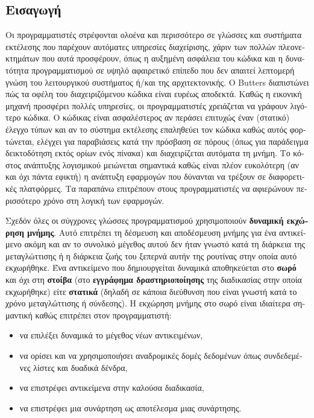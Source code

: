\begin{greek}
\chapter{Εισαγωγή}\label{ch:intro}

Οι προγραμματιστές στρέφονται ολοένα και περισσότερο σε γλώσσες
και συστήματα εκτέλεσης που παρέχουν αυτόματες υπηρεσίες διαχείρισης,
χάριν των πολλών πλεονεκτημάτων
που αυτά προσφέρουν, όπως η αυξημένη ασφάλεια του κώδικα και
η δυνατότητα προγραμματισμού σε υψηλό αφαιρετικό επίπεδο που δεν
απαιτεί λεπτομερή γνώση του λειτουργικού συστήματος ή/και της
αρχιτεκτονικής. Ο Butters \cite{butt07} διαπιστώνει πώς τα οφέλη
του διαχειριζόμενου κώδικα είναι ευρέως αποδεκτά. Καθώς η εικονική
μηχανή προσφέρει πολλές υπηρεσίες, οι προγραμματιστές χρειάζεται
να γράφουν λιγότερο κώδικα. Ο κώδικας είναι ασφαλέστερος αν περάσει
επιτυχώς έναν (στατικό) έλεγχο τύπων και αν το σύστημα εκτέλεσης
επαληθεύει τον κώδικα καθώς αυτός φορτώνεται, ελέγχει για παραβιάσεις
κατά την πρόσβαση σε πόρους (όπως για παράδειγμα δεικτοδότηση εκτός
ορίων ενός πίνακα) και διαχειρίζεται αυτόματα τη μνήμη. Το κόστος
ανάπτυξης λογισμικού μειώνεται σημαντικά καθώς είναι πλέον ευκολότερη
(αν και όχι πάντα εφικτή) η ανάπτυξη εφαρμογών που δύνανται να
τρέξουν σε διαφορετικές πλατφόρμες. Τα παραπάνω επιτρέπουν στους
προγραμματιστές να αφιερώνουν περισσότερο χρόνο στη λογική των
εφαρμογών.

Σχεδόν όλες οι σύγχρονες γλώσσες προγραμματισμού χρησιμοποιούν
\textbf{δυναμική εκχώρηση μνήμης}. Αυτό επιτρέπει τη δέσμευση
και αποδέσμευση μνήμης για ένα αντικείμενο ακόμη και αν το συνολικό
μέγεθος αυτού δεν ήταν γνωστό κατά τη διάρκεια της μεταγλώττισης
ή η διάρκεια ζωής του ξεπερνά αυτήν της ρουτίνας στην οποία
αυτό εκχωρήθηκε. Ένα αντικείμενο που δημιουργείται δυναμικά
αποθηκεύεται στο \textbf{σωρό} και όχι στη \textbf{στοίβα}
(στο \textbf{εγγράφημα δραστηριοποίησης} της διαδικασίας στην
οποία εκχωρήθηκε) είτε \textbf{στατικά} (δηλαδή σε κάποια διεύθυνση
που είναι γνωστή κατά το χρόνο μεταγλώττισης ή σύνδεσης). Η
εκχώρηση μνήμης στο σωρό είναι ιδιαίτερα σημαντική καθώς επιτρέπει
στον προγραμματιστή:

\begin{itemize}
\item να επιλέξει δυναμικά το μέγεθος νέων αντικειμένων,
\item να ορίσει και να χρησιμοποιήσει αναδρομικές δομές δεδομένων 
      όπως συνδεδεμένες λίστες και δυαδικά δένδρα,
\item να επιστρέφει αντικείμενα στην καλούσα διαδικασία,
\item να επιστρέφει μια συνάρτηση ως αποτέλεσμα μιας συνάρτησης.
\end{itemize}


\end{greek}
